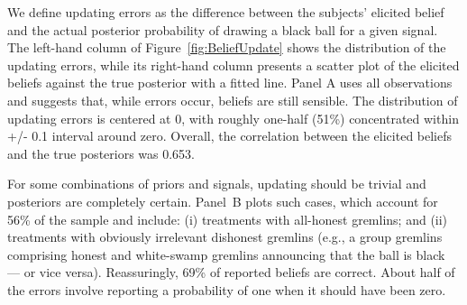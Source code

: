 \documentclass[12pt,a4paper]{article}
\begin{document}
\begin{figure}[H]
	\hfill
	\vspace{2em}
	\hfill
	\hfill
\end{figure}

We define updating errors as the difference between the subjects' elicited belief and the actual posterior probability of drawing a black ball for a given signal.  The left-hand column of Figure~\ref{fig:BeliefUpdate} shows the distribution of the updating errors, while its right-hand column presents a scatter plot of the elicited beliefs against the true posterior with a fitted line.
Panel A uses all observations and suggests that, while errors occur, beliefs are still sensible. The distribution of updating errors is centered at 0, with roughly one-half (51\%) concentrated within +/- 0.1 interval around zero. Overall, the correlation between the elicited beliefs and the true posteriors was 0.653.  

For some combinations of priors and signals, updating should be trivial and posteriors are completely certain.  
Panel~B plots such cases, which account for 56\% of the sample and include: (i) treatments with all-honest gremlins; and (ii) treatments with obviously irrelevant dishonest gremlins (e.g., a group gremlins comprising honest and white-swamp gremlins announcing that the ball is black --- or vice versa). Reassuringly, 69\% of reported beliefs are correct. About half of the errors involve reporting a probability of one when it should have been zero.
\end{document}
